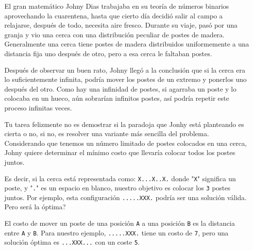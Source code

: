 El gran matemático Johny Dias trabajaba en su teoría de números binarios aprovechando la cuarentena, hasta que cierto día decidió salir al campo a relajarse, después de todo, necesita aire fresco. Durante su viaje, pasó por una granja y vio una cerca con una distribución peculiar de postes de madera. Generalmente una cerca tiene postes de madera distribuidos uniformemente a una distancia fija uno después de otro, pero a esa cerca le faltaban postes.

Después de observar un buen rato, Johny llegó a la conclusión que si la cerca era lo suficientemente infinita, podría mover los postes de un extremo y ponerlos uno después del otro. Como hay una infinidad de postes, si agarraba un poste y lo colocaba en un hueco, aún sobrarían infinitos postes, así podría repetir este proceso infinitas veces.

Tu tarea felizmente no es demostrar si la paradoja que Jonhy está planteando es cierta o no, si no, es resolver una variante más sencilla del problema. Considerando que tenemos un número limitado de postes colocados en una cerca, Johny quiere determinar el mínimo costo que llevaría colocar todos los postes juntos.

Es decir, si la cerca está representada como: \texttt{X...X..X.} donde "\texttt{X}" significa un poste, y "\texttt{.}" es un espacio en blanco, nuestro objetivo es colocar los \texttt{3} postes juntos. Por ejemplo, esta configuración \texttt{.....XXX.} podría ser una solución válida. Pero será la óptima?

El costo de mover un poste de una posición \texttt{A} a una posición \texttt{B} es la distancia entre \texttt{A} y \texttt{B}. Para nuestro ejemplo, \texttt{.....XXX.} tiene un costo de \texttt{7}, pero una solución óptima es \texttt{...XXX...} con un coste \texttt{5}.
